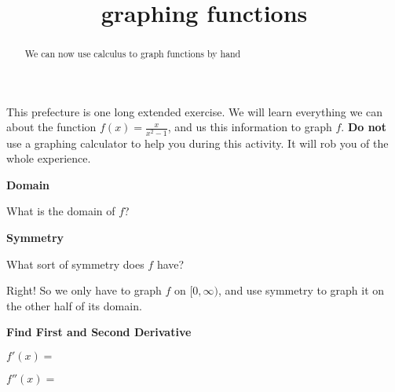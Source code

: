 \documentclass{ximera}
\title{graphing functions}
\begin{document}
\begin{abstract}
  We can now use calculus to graph functions by hand
\end{abstract}

\maketitle


This prefecture is one long extended exercise.  We will learn everything we can about the function $f(x) = \frac{x}{x^2-1}$, and us this information to graph $f$.
\textbf{Do not} use a graphing calculator to help you during this activity.  It will rob you of the whole experience.

\begin{question}

\textbf{Domain}

\begin{solution}
What is the domain of $f$?
 
    \begin{multipleChoice}
    \end{multipleChoice}
    
\end{solution}    

\textbf{Symmetry}

\begin{solution}
   What sort of symmetry does $f$ have?
   
    \begin{multipleChoice}
    \end{multipleChoice}

\end{solution}    

    Right!  So we only have to graph $f$ on $[0,\infty)$, and use symmetry to graph it on the other half of its domain.
    
 \textbf{Find First and Second Derivative}
 
 \begin{solution}
 	$f'(x)=$
 \end{solution}
 
 \begin{solution}
 	$f''(x)=$
 \end{solution}
 

\end{question}
\end{document}
